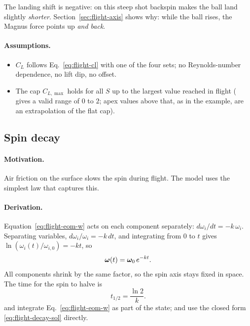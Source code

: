 The landing shift is negative: on this steep shot backspin makes the ball land slightly \emph{shorter}.
Section~\ref{sec:flight-axis} shows why: while the ball rises, the Magnus force points up \emph{and back}.

\paragraph{Assumptions.}
\begin{itemize}
  \item $C_L$ follows Eq.~\eqref{eq:flight-cl} with one of the four sets; no Reynolds-number dependence,
    no lift dip, no offset.
  \item The cap $C_{L,\max}$ holds for all $S$ up to the largest value reached in flight
    ( gives a valid range of $0$ to $2$\assumed; apex values above that, as in the
    example, are an extrapolation of the flat cap).
\end{itemize}

\subsection{Spin decay}
\label{sec:flight-decay}

\paragraph{Motivation.}
Air friction on the surface slows the spin during flight.
The model uses the simplest law that captures this.

\paragraph{Derivation.}
Equation~\eqref{eq:flight-eom-w} acts on each component separately: $d\omega_i/dt = -k\,\omega_i$.
Separating variables, $d\omega_i/\omega_i = -k\,dt$, and integrating from $0$ to $t$ gives
$\ln(\omega_i(t)/\omega_{i,0}) = -kt$, so
\begin{equation}
  \bm{\omega}(t) = \bm{\omega}_0\,e^{-kt}.
  \label{eq:flight-decay-sol}
\end{equation}
All components shrink by the same factor, so the spin axis stays fixed in space.
The time for the spin to halve is
\begin{equation}
  t_{1/2} = \frac{\ln 2}{k}.
  \label{eq:flight-halflife}
\end{equation}
 and  integrate Eq.~\eqref{eq:flight-eom-w} as part of the
state;  and  use the closed form
\eqref{eq:flight-decay-sol} directly.

